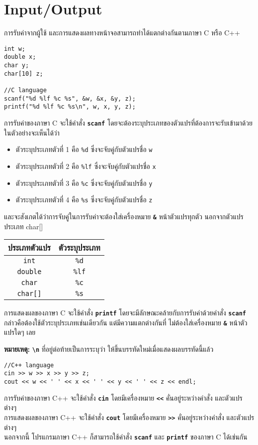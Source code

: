 \section{Input/Output}

การรับค่าจากผู้ใช้ และการแสดงผลทางหน้าจอสามารถทำได้แตกต่างกันตามภาษา C หรือ C++
\begin{lstlisting}
int w;
double x;
char y;
char[10] z;

//C language
scanf("%d %lf %c %s", &w, &x, &y, z);
printf("%d %lf %c %s\n", w, x, y, z);
\end{lstlisting}
การรับค่าของภาษา C จะใช้คำสั่ง \textbf{\texttt{scanf}} โดยจะต้องระบุประเภทของตัวแปรที่ต้องการจะรับเข้ามาด้วย ในตัวอย่างจะเห็นได้ว่า
\begin{itemize}
\item ตัวระบุประเภทตัวที่ 1 คือ \texttt{\%d} ซึ่งจะจับคู่กับตัวแปรชื่อ \texttt{w}
\item ตัวระบุประเภทตัวที่ 2 คือ \texttt{\%lf} ซึ่งจะจับคู่กับตัวแปรชื่อ \texttt{x}
\item ตัวระบุประเภทตัวที่ 3 คือ \texttt{\%c} ซึ่งจะจับคู่กับตัวแปรชื่อ \texttt{y}
\item ตัวระบุประเภทตัวที่ 4 คือ \texttt{\%s} ซึ่งจะจับคู่กับตัวแปรชื่อ \texttt{z}
\end{itemize}
และจะสังเกตได้ว่าการจับคู่ในการรับค่าจะต้องใส่เครื่องหมาย \textbf{\texttt{\&}} หน้าตัวแปรทุกตัว นอกจากตัวแปรประเภท char[]
\begin{center}
\begin{tabular}{||c|c||}
\hline
ประเภทตัวแปร & ตัวระบุประเภท \\
\hline
\texttt{int} & \texttt{\%d} \\
\texttt{double} & \texttt{\%lf} \\
\texttt{char} & \texttt{\%c} \\
\texttt{char[]} & \texttt{\%s} \\
\hline
\end{tabular}
\end{center}
การแสดงผลของภาษา C จะใช้คำสั่ง \textbf{\texttt{printf}} โดยจะมีลักษณะคล้ายกับการรับค่าด้วยคำสั่ง \textbf{\texttt{scanf}} กล่าวคือต้องใช้ตัวระบุประเภทเช่นเดียวกัน แต่มีความแตกต่างกันที่ ไม่ต้องใส่เครื่องหมาย \textbf{\texttt{\&}} หน้าตัวแปรใดๆ เลย

\noindent\textbf{หมายเหตุ:} \textbf{\texttt{\textbackslash n}} ที่อยู่ต่อท้ายเป็นการระบุว่า ให้ขึ้นบรรทัดใหม่เมื่อแสดงผลบรรทัดนี้แล้ว

\begin{lstlisting}
//C++ language
cin >> w >> x >> y >> z;
cout << w << ' ' << x << ' ' << y << ' ' << z << endl;
\end{lstlisting}
การรับค่าของภาษา C++ จะใช้คำสั่ง \textbf{\texttt{cin}} โดยมีเครื่องหมาย \textbf{\texttt{<<}} คั่นอยู่ระหว่างคำสั่ง และตัวแปรต่างๆ \\
การแสดงผลของภาษา C++ จะใช้คำสั่ง \textbf{\texttt{cout}} โดยมีเครื่องหมาย \textbf{\texttt{>>}} คั่นอยู่ระหว่างคำสั่ง และตัวแปรต่างๆ \\
นอกจากนี้ โปรแกรมภาษา C++ ก็สามารถใช้คำสั่ง \textbf{\texttt{scanf}} และ \textbf{\texttt{printf}} ของภาษา C ได้เช่นกัน

